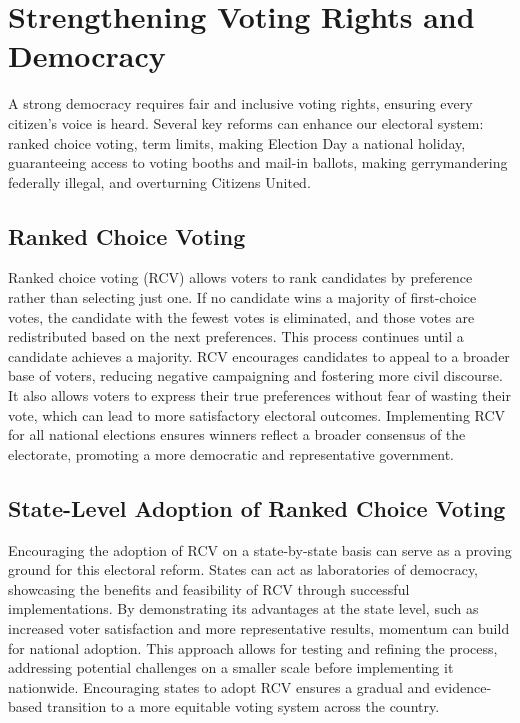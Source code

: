 \section{Strengthening Voting Rights and Democracy}\label{sec:voting-rights}
A strong democracy requires fair and inclusive voting rights, ensuring every citizen's voice is heard.
Several key reforms can enhance our electoral system: ranked choice voting, term limits, making Election Day a national holiday, guaranteeing access to voting booths and mail-in ballots, making gerrymandering federally illegal, and overturning Citizens United.

\subsection{Ranked Choice Voting}\label{subsec:ranked-choice-voting}
Ranked choice voting (RCV) allows voters to rank candidates by preference rather than selecting just one.
If no candidate wins a majority of first-choice votes, the candidate with the fewest votes is eliminated, and those votes are redistributed based on the next preferences.
This process continues until a candidate achieves a majority.
RCV encourages candidates to appeal to a broader base of voters, reducing negative campaigning and fostering more civil discourse.
It also allows voters to express their true preferences without fear of wasting their vote, which can lead to more satisfactory electoral outcomes.
Implementing RCV for all national elections ensures winners reflect a broader consensus of the electorate, promoting a more democratic and representative government.

\subsection{State-Level Adoption of Ranked Choice Voting}\label{subsec:state-level-adoption-of-ranked-choice-voting}
Encouraging the adoption of RCV on a state-by-state basis can serve as a proving ground for this electoral reform.
States can act as laboratories of democracy, showcasing the benefits and feasibility of RCV through successful implementations.
By demonstrating its advantages at the state level, such as increased voter satisfaction and more representative results, momentum can build for national adoption.
This approach allows for testing and refining the process, addressing potential challenges on a smaller scale before implementing it nationwide.
Encouraging states to adopt RCV ensures a gradual and evidence-based transition to a more equitable voting system across the country.

